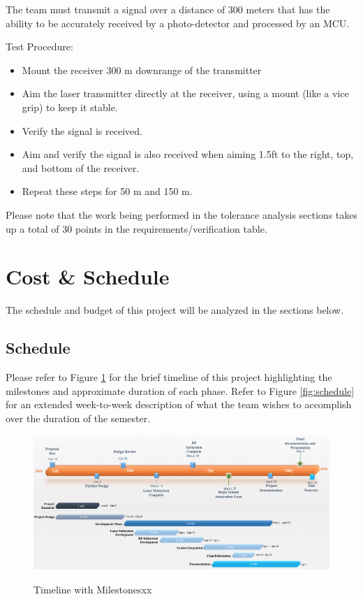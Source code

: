 \documentclass[openbib,letterpaper,10pt]{article}
\begin{document}
\begin{spacing}{1.15}
The team must transmit a signal over a distance of 300 meters that has the ability to be accurately received by a photo-detector and processed by an MCU. 

Test Procedure:
 
\begin{itemize}
	\item Mount the receiver 300 m downrange of the transmitter
	\item Aim the laser transmitter directly at the receiver, using a mount (like a vice grip) to keep it stable. 
	\item Verify the signal is received.
	\item Aim and verify the signal is also received when aiming 1.5ft to the right, top, and bottom of the receiver. 
	\item Repeat these steps for 50 m and 150 m. 
\end{itemize}

Please note that the work being performed in the tolerance analysis sections takes up a total of 30 points in the requirements/verification table. 


\section{Cost \& Schedule}
The schedule and budget of this project will be analyzed in the sections below.

\subsection{Schedule}
Please refer to Figure \ref{fig:timeline} for the brief timeline of this project highlighting the milestones and approximate duration of each phase. Refer to Figure \ref{fig:schedule} for an extended week-to-week description of what the team wishes to accomplish over the duration of the semester.


\begin{figure} [H]
	\centering
	\includegraphics[scale=0.5]{Timeline.png}
	\label{fig:timeline}
	\caption{Timeline with Milestones\label{fig:timeline}xx}
\end{figure}


\end{spacing}
\end{document}
